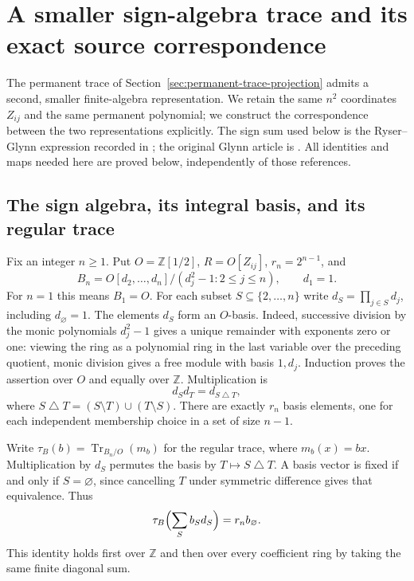 \section{A smaller sign-algebra trace and its exact source correspondence}
\label{sec:compressed-permanent-trace}

The permanent trace of Section~\ref{sec:permanent-trace-projection}
admits a second, smaller finite-algebra representation. We retain the
same $n^2$ coordinates $Z_{ij}$ and the same permanent polynomial;
we construct the correspondence between the two representations explicitly.
The sign sum used below is the Ryser--Glynn expression recorded in
\cite[Equation (8)]{LandsbergRessayre2017SignTrace}; the original
Glynn article is \cite{Glynn2010SignTrace}. All identities and maps
needed here are proved below, independently of those references.

\subsection{The sign algebra, its integral basis, and its regular trace}

Fix an integer $n\ge1$. Put $O=\mathbb Z[1/2]$, $R=O[Z_{ij}]$,
$r_n=2^{n-1}$, and
\[
 B_n=O[d_2,\ldots,d_n]/(d_j^2-1:2\le j\le n),\qquad d_1=1.
\]
For $n=1$ this means $B_1=O$. For each subset
$S\subseteq\{2,\ldots,n\}$ write $d_S=\prod_{j\in S}d_j$,
including $d_\varnothing=1$. The elements $d_S$ form an $O$-basis.
Indeed, successive division by the monic polynomials $d_j^2-1$
gives a unique remainder with exponents zero or one: viewing the
ring as a polynomial ring in the last variable over the preceding
quotient, monic division gives a free module with basis $1,d_j$.
Induction proves the assertion over $O$ and equally over $\mathbb Z$.
Multiplication is
\[
 d_Sd_T=d_{S\mathbin{\triangle}T},
\]
where $S\mathbin{\triangle}T=(S\setminus T)\cup(T\setminus S)$.
There are exactly $r_n$ basis elements, one for each independent
membership choice in a set of size $n-1$.

Write $\tau_B(b)=\operatorname{Tr}_{B_n/O}(m_b)$ for the regular
trace, where $m_b(x)=bx$. Multiplication by $d_S$ permutes the basis
by $T\mapsto S\mathbin{\triangle}T$. A basis vector is fixed if
and only if $S=\varnothing$, since cancelling $T$ under symmetric
difference gives that equivalence. Thus
\begin{equation}\label{eq:compressed-regular-trace}
 \tau_B\Bigl(\sum_S b_Sd_S\Bigr)=r_n b_\varnothing.
\end{equation}
This identity holds first over $\mathbb Z$ and then over every
coefficient ring by taking the same finite diagonal sum.

